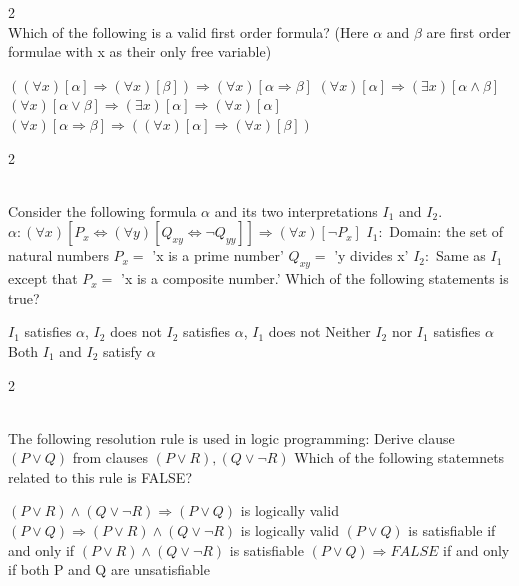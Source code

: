 \documentclass[12pt]{exam}
\begin{document}
\begin{questions}
\begin{multicols*}{2}
 \\[0.2cm]
{\Large Which of the following is a valid first order formula? (Here $\alpha$ and $\beta$ are first order formulae with x as their only free variable)}
\begin{choices}
  \choice $((\forall x) [\alpha] \Rightarrow (\forall x) [\beta]) \Rightarrow (\forall x) [\alpha \Rightarrow \beta]$
  \choice $(\forall x) [\alpha] \Rightarrow (\exists x) [\alpha \wedge \beta]$
  \choice $(\forall x) [\alpha \vee \beta] \Rightarrow (\exists x) [\alpha] \Rightarrow (\forall x) [\alpha]$
  \choice $(\forall x) [\alpha \Rightarrow \beta] \Rightarrow ((\forall x) [\alpha] \Rightarrow (\forall x) [\beta])$
\end{choices}

\end{multicols*}
\vspace{0.6cm}
\newpage
\begin{multicols*}{2}

 \\[0.2cm]
{\Large Consider the following formula $\alpha$ and its two interpretations $I_1$ and $I_2$.\newline
$\alpha : (\forall x) [P_x \Leftrightarrow (\forall y) [Q_{xy} \Leftrightarrow \neg Q_{yy}]] \Rightarrow (\forall x) [\neg P_x]$\newline
 $I_1 :$ Domain: the set of natural numbers \newline
$P_x =$ 'x is a prime number' \newline
$Q_{xy} =$ 'y divides x' \newline
$I_2 :$ Same as $I_1$ except that $P_x =$ 'x is a composite number.' \newline
Which of the following statements is true?}
\begin{choices}
  \choice $I_1$ satisfies $\alpha$, $I_2$ does not
  \choice $I_2$ satisfies $\alpha$, $I_1$ does not
  \choice Neither $I_2$ nor $I_1$ satisfies $\alpha$
  \choice Both $I_1$ and $I_2$ satisfy $\alpha$
\end{choices}

\end{multicols*}
\vspace{0.6cm}
\newpage
\begin{multicols*}{2}

 \\[0.2cm]
{\Large The following resolution rule is used in logic programming: Derive clause $(P \vee Q)$ from clauses $(P \vee R), (Q \vee \neg R)$ Which of the following statemnets related to this rule is FALSE?}
\begin{choices}
  \choice $(P \vee R) \wedge (Q \vee \neg R) \Rightarrow (P \vee Q)$ is logically valid
  \choice $(P \vee Q) \Rightarrow (P \vee R) \wedge (Q \vee \neg R)$ is logically valid
  \choice $(P \vee Q)$ is satisfiable if and only if $(P \vee R) \wedge (Q \vee \neg R)$ is satisfiable
  \choice $(P \vee Q) \Rightarrow FALSE$ if and only if both P and Q are unsatisfiable
\end{choices}


\end{multicols*}
\end{questions}
\end{document}
